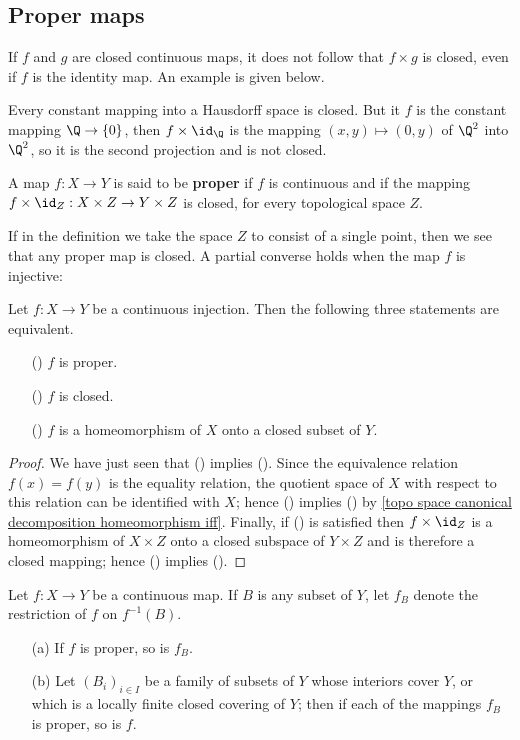 \subsection{Proper maps}
If $f$ and $g$ are closed continuous maps, it does not follow that $f\times g$ is closed, even if $f$ is the identity map. An example is given below.
\begin{example}
Every constant mapping into a Hausdorff space is closed. But it $f$ is the constant mapping $\Q\to\{0\}$, then $f\times\id_\Q$ is the mapping $(x,y)\mapsto(0,y)$ of $\Q^2$ into $\Q^2$, so it is the second projection and is not closed.
\end{example}
\begin{definition}
A map $f:X\to Y$ is said to be \textbf{proper} if $f$ is continuous and if the mapping $f\times\id_Z:X\times Z\to Y\times Z$ is closed, for every topological space $Z$.
\end{definition}
If in the definition we take the space $Z$ to consist of a single point, then we see that any proper map is closed. A partial converse holds when the map $f$ is injective:
\begin{proposition}\label{topo space injection proper iff}
Let $f:X\to Y$ be a continuous injection. Then the following three statements are equivalent.
\begin{itemize}
\item[(\rmnum{1})] $f$ is proper.
\item[(\rmnum{2})] $f$ is closed.
\item[(\rmnum{3})] $f$ is a homeomorphism of $X$ onto a closed subset of $Y$.
\end{itemize}
\end{proposition}
\begin{proof}
We have just seen that () implies (). Since the equivalence relation $f(x)=f(y)$ is the equality relation, the quotient space of $X$ with respect to this relation can be identified with $X$; hence () implies () by \cref{topo space canonical decomposition homeomorphism iff}. Finally, if () is satisfied then $f\times\id_Z$ is a homeomorphism of $X\times Z$ onto a closed subspace of $Y\times Z$ and is therefore a closed mapping; hence () implies ().
\end{proof}
\begin{proposition}\label{topo space proper map on subspace}
Let $f:X\to Y$ be a continuous map. If $B$ is any subset of $Y$, let $f_B$ denote the restriction of $f$ on $f^{-1}(B)$.
\begin{itemize}
\item[(a)] If $f$ is proper, so is $f_B$.
\item[(b)] Let $(B_i)_{i\in I}$ be a family of subsets of $Y$ whose interiors cover $Y$, or which is a locally finite closed covering of $Y$; then if each of the mappings $f_B$ is proper, so is $f$.
\end{itemize}
\end{proposition}
